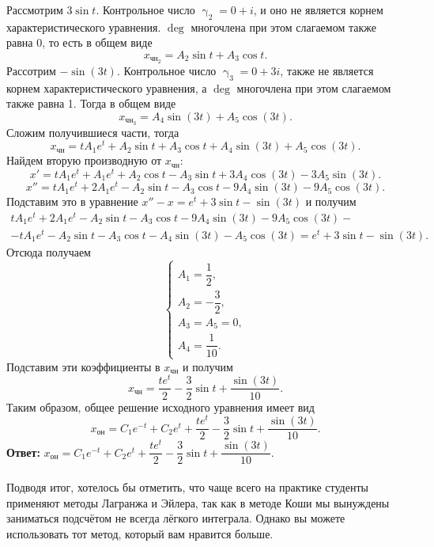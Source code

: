 \documentclass[a4paper, 12pt]{article}
\begin{document}
Рассмотрим $3\sin t$. Контрольное число $\upgamma_2 = 0 + i$, и оно не является корнем характеристического уравнения. $\deg$ многочлена при этом слагаемом также равна 0, то есть в общем виде $$x_{\text{чн}_2} = A_2\sin t + A_3 \cos t.$$
Рассотрим $-\sin (3t)$. Контрольное число $\upgamma_3 = 0 + 3i$, также не является корнем характеристического уравнения, а $\deg$ многочлена при этом слагаемом также равна 1. Тогда в общем виде $$x_{\text{чн}_3} = A_4\sin (3t) + A_5 \cos (3t).$$
Сложим получившиеся части, тогда $$x_{\text{чн}} = tA_1e^t + A_2\sin t + A_3 \cos t + A_4\sin (3t) + A_5 \cos (3t).$$
Найдем вторую производную от $x_\text{чн}$:
$$x' = tA_1e^t + A_1e^t + A_2\cos t - A_3\sin t + 3A_4\cos(3t) - 3A_5\sin(3t).$$
$$x'' = tA_1e^t + 2A_1e^t - A_2\sin t - A_3\cos t - 9A_4\sin(3t) - 9A_5\cos(3t).$$
Подставим это в уравнение $x'' - x = e^t + 3\sin t - \sin(3t)$ и получим \begin{multline*}
	tA_1e^t + 2A_1e^t - A_2\sin t - A_3\cos t - 9A_4\sin(3t) - 9A_5\cos(3t) -\\- tA_1e^t - A_2\sin t - A_3 \cos t -A_4\sin (3t) - A_5 \cos (3t) = e^t + 3\sin t - \sin(3t).
\end{multline*}
Отсюда получаем $$\begin{cases}
	A_1 = \dfrac{1}{2},\\
	A_2 = -\dfrac{3}{2},\\
	A_3 = A_5 = 0,\\
	A_4 = \dfrac{1}{10}.
\end{cases}$$
Подставим эти коэффициенты в $x_\text{чн}$ и получим 
$$x_\text{чн} = \dfrac{te^t}{2} - \dfrac{3}{2}\sin t + \dfrac{\sin(3t)}{10}.$$
Таким образом, общее решение исходного уравнения имеет вид
$$x_\text{он} = C_1e^{-t} + C_2e^t + \dfrac{te^t}{2} - \dfrac{3}{2}\sin t + \dfrac{\sin(3t)}{10}.$$
\textbf{Ответ:} $x_\text{он} = C_1e^{-t} + C_2e^t + \dfrac{te^t}{2} - \dfrac{3}{2}\sin t + \dfrac{\sin(3t)}{10}.$
\\\\
Подводя итог, хотелось бы отметить, что чаще всего на практике студенты применяют методы Лагранжа и Эйлера, так как в методе Коши мы вынуждены заниматься подсчётом не всегда лёгкого интеграла. Однако вы можете использовать тот метод, который вам нравится больше.
\end{document}

